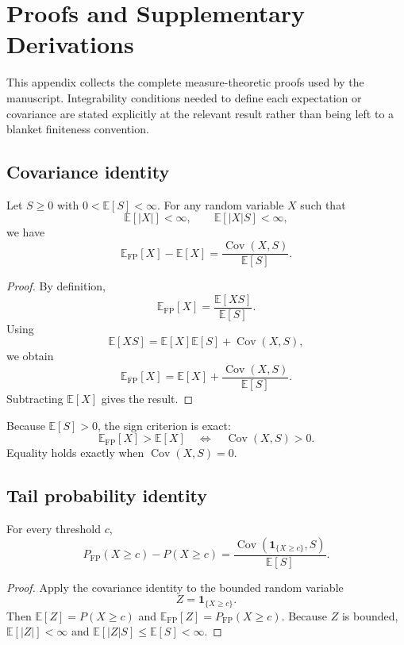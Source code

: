 \appendix
\section{Proofs and Supplementary Derivations}

This appendix collects the complete measure-theoretic proofs used by the manuscript. Integrability conditions needed to define each expectation or covariance are stated explicitly at the relevant result rather than being left to a blanket finiteness convention.

\subsection{Covariance identity}

\begin{theorem}
Let $S\ge0$ with $0<\mathbb E[S]<\infty$. For any random variable $X$ such that
\[
\mathbb E[|X|]<\infty,
\qquad
\mathbb E[|X|S]<\infty,
\]
we have
\[
\mathbb E_{\mathrm{FP}}[X]-\mathbb E[X]
=
\frac{\operatorname{Cov}(X,S)}{\mathbb E[S]}.
\]
\end{theorem}

\begin{proof}
By definition,
\[
\mathbb E_{\mathrm{FP}}[X]
=
\frac{\mathbb E[XS]}{\mathbb E[S]}.
\]
Using
\[
\mathbb E[XS]
=
\mathbb E[X]\mathbb E[S]+\operatorname{Cov}(X,S),
\]
we obtain
\[
\mathbb E_{\mathrm{FP}}[X]
=
\mathbb E[X]
+
\frac{\operatorname{Cov}(X,S)}{\mathbb E[S]}.
\]
Subtracting $\mathbb E[X]$ gives the result.
\end{proof}

Because $\mathbb E[S]>0$, the sign criterion is exact:
\[
\mathbb E_{\mathrm{FP}}[X]>\mathbb E[X]
\quad\Longleftrightarrow\quad
\operatorname{Cov}(X,S)>0.
\]
Equality holds exactly when $\operatorname{Cov}(X,S)=0$.

\subsection{Tail probability identity}

\begin{theorem}
For every threshold $c$,
\[
P_{\mathrm{FP}}(X\ge c)-P(X\ge c)
=
\frac{\operatorname{Cov}(\mathbf 1_{\{X\ge c\}},S)}{\mathbb E[S]}.
\]
\end{theorem}

\begin{proof}
Apply the covariance identity to the bounded random variable
\[
Z=\mathbf 1_{\{X\ge c\}}.
\]
Then $\mathbb E[Z]=P(X\ge c)$ and $\mathbb E_{\mathrm{FP}}[Z]=P_{\mathrm{FP}}(X\ge c)$. Because $Z$ is bounded, $\mathbb E[|Z|]<\infty$ and $\mathbb E[|Z|S]\le\mathbb E[S]<\infty$.
\end{proof}

